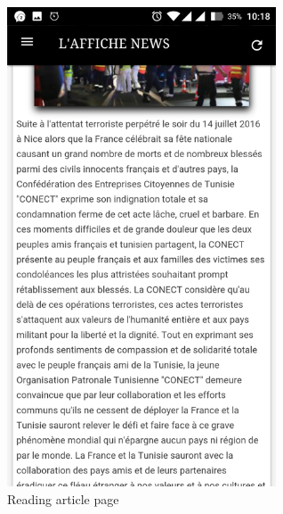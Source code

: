 \begin{figure}[H]
	\centering
	\includegraphics[width=8cm]{screenshot6.png}
	\caption{Reading article page}
	\label{screenshot}

\end{figure}

